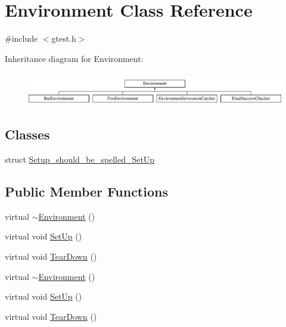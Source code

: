 \hypertarget{classtesting_1_1Environment}{\section{\-Environment \-Class \-Reference}
\label{dc/d71/classtesting_1_1Environment}
}


{\ttfamily \#include $<$gtest.\-h$>$}

\-Inheritance diagram for \-Environment\-:\begin{figure}[H]
\begin{center}
\leavevmode
\includegraphics[height=1.450777cm]{dc/d71/classtesting_1_1Environment}
\end{center}
\end{figure}
\subsection*{\-Classes}
\begin{DoxyCompactItemize}
\item 
struct \hyperlink{structtesting_1_1Environment_1_1Setup__should__be__spelled__SetUp}{\-Setup\-\_\-should\-\_\-be\-\_\-spelled\-\_\-\-Set\-Up}
\end{DoxyCompactItemize}
\subsection*{\-Public \-Member \-Functions}
\begin{DoxyCompactItemize}
\item 
virtual \hyperlink{classtesting_1_1Environment_a6b8b9677be18dad35b3af83e77d1b339}{$\sim$\-Environment} ()
\item 
virtual void \hyperlink{classtesting_1_1Environment_a901706a587f9ae84df8b2395fbe759cb}{\-Set\-Up} ()
\item 
virtual void \hyperlink{classtesting_1_1Environment_a870a092058305911f3d42df45dd657e5}{\-Tear\-Down} ()
\item 
virtual \hyperlink{classtesting_1_1Environment_a6b8b9677be18dad35b3af83e77d1b339}{$\sim$\-Environment} ()
\item 
virtual void \hyperlink{classtesting_1_1Environment_a901706a587f9ae84df8b2395fbe759cb}{\-Set\-Up} ()
\item 
virtual void \hyperlink{classtesting_1_1Environment_a870a092058305911f3d42df45dd657e5}{\-Tear\-Down} ()
\end{DoxyCompactItemize}

